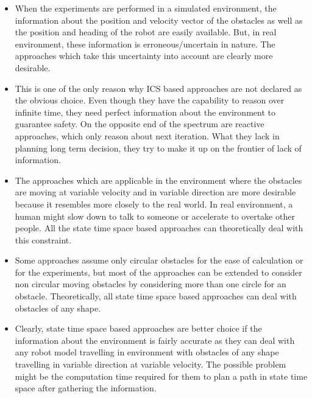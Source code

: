 \begin{itemize}
    \item When the experiments are performed in a simulated environment, the information about the position and velocity vector of the obstacles as well as the position and heading of the robot are easily available. But, in real environment, these information is erroneous/uncertain in nature. The approaches which take this uncertainty into account are clearly more desirable. 
    \item This is one of the only reason why ICS based approaches are not declared as the obvious choice. Even though they have the capability to reason over infinite time, they need perfect information about the environment to guarantee safety. On the opposite end of the spectrum are reactive approaches, which only reason about next iteration. What they lack in planning long term decision, they try to make it up on the frontier of lack of information.
    \item The approaches which are applicable in the environment where the obstacles are moving at variable velocity and in variable direction are more desirable because it resembles more closely to the real world. In real environment, a human might slow down to talk to someone or accelerate to overtake other people. All the state time space based approaches can theoretically deal with this constraint.
    \item Some approaches assume only circular obstacles for the ease of calculation or for the experiments, but most of the approaches can be extended to consider non circular moving obstacles by considering more than one circle for an obstacle\cite{large2005navigation}. Theoretically, all state time space based approaches can deal with obstacles of any shape.
    \item Clearly, state time space based approaches are better choice if the information about the environment is fairly accurate as they can deal with any robot model travelling in environment with obstacles of any shape travelling in variable direction at variable velocity. The possible problem might be the computation time required for them to plan a path in state time space after gathering the information.
\end{itemize}

